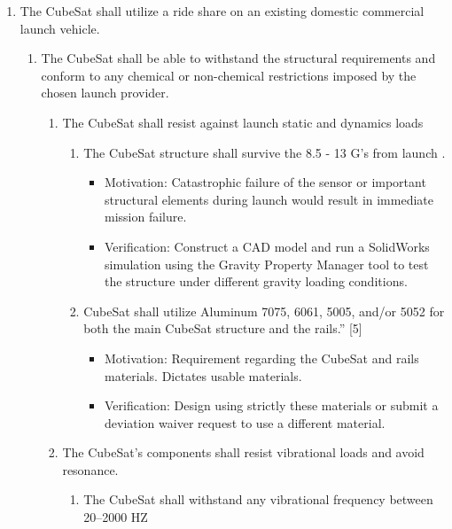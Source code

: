 \documentclass{ece}
\begin{document}
\begin{enumerate}
\begin{enumerate}
    \end{enumerate} %
    \item The CubeSat shall utilize a ride share on an existing domestic commercial launch vehicle.
    \begin{enumerate}
        \item The CubeSat shall be able to withstand the structural requirements and conform to any chemical or non-chemical restrictions imposed by the chosen launch provider.  
        \begin{enumerate}
            \item The CubeSat shall resist against launch static and dynamics loads 
            \begin{enumerate}
                \item The CubeSat structure shall survive the 8.5 - 13 G’s from launch . 
                    \begin{itemize}
                        \item Motivation: Catastrophic failure of the sensor or important structural elements during launch would result in immediate mission failure.  
                        \item Verification: Construct a CAD model and run a SolidWorks simulation using the Gravity Property Manager tool to test the structure under different gravity loading conditions.
                    \end{itemize}
                \item CubeSat shall utilize Aluminum 7075, 6061, 5005, and/or 5052 for both the main CubeSat structure and the rails.” [5]  
                    \begin{itemize}
                        \item Motivation: Requirement regarding the CubeSat and rails materials. Dictates usable materials.   
                        \item Verification: Design using strictly these materials or submit a deviation waiver request to use a different material. 
                    \end{itemize}
            \end{enumerate}
        \item The CubeSat’s components shall resist vibrational loads and avoid resonance. 
        \begin{enumerate}
            \item The CubeSat shall withstand any vibrational frequency between 20–2000 HZ 
                \begin{itemize}

\end{itemize}
\end{enumerate}
\end{enumerate}
\end{enumerate}
\end{enumerate}
\end{document}
